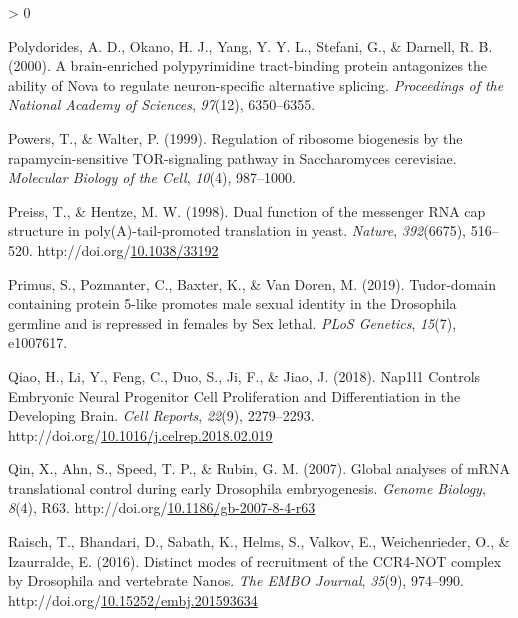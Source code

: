 \documentclass[12pt,oneside]{reedthesis}
\newlength{\cslhangindent}
\newenvironment{CSLReferences}[2] %
 {%
  \setlength{\parindent}{0pt}
  \ifodd #1 \everypar{\setlength{\hangindent}{\cslhangindent}}\ignorespaces\fi
  \ifnum #2 > 0
  \setlength{\parskip}{#2\baselineskip}
  \fi
 }%
 {}
\begin{document}
\begin{CSLReferences}{1}{0}
\leavevmode\hypertarget{ref-Polydorides2000}{}%
Polydorides, A. D., Okano, H. J., Yang, Y. Y. L., Stefani, G., \& Darnell, R. B. (2000). A brain-enriched polypyrimidine tract-binding protein antagonizes the ability of {Nova} to regulate neuron-specific alternative splicing. \emph{Proceedings of the National Academy of Sciences}, \emph{97}(12), 6350--6355.

\leavevmode\hypertarget{ref-powersRegulationRibosomeBiogenesis1999}{}%
Powers, T., \& Walter, P. (1999). Regulation of ribosome biogenesis by the rapamycin-sensitive {TOR}-signaling pathway in {Saccharomyces} cerevisiae. \emph{Molecular Biology of the Cell}, \emph{10}(4), 987--1000.

\leavevmode\hypertarget{ref-Preiss1998g}{}%
Preiss, T., \& Hentze, M. W. (1998). Dual function of the messenger {RNA} cap structure in poly({A})-tail-promoted translation in yeast. \emph{Nature}, \emph{392}(6675), 516--520. http://doi.org/\href{https://doi.org/10.1038/33192}{10.1038/33192}

\leavevmode\hypertarget{ref-Primus2019}{}%
Primus, S., Pozmanter, C., Baxter, K., \& Van Doren, M. (2019). Tudor-domain containing protein 5-like promotes male sexual identity in the {Drosophila} germline and is repressed in females by {Sex} lethal. \emph{PLoS Genetics}, \emph{15}(7), e1007617.

\leavevmode\hypertarget{ref-qiaoNap1l1ControlsEmbryonic2018}{}%
Qiao, H., Li, Y., Feng, C., Duo, S., Ji, F., \& Jiao, J. (2018). Nap1l1 {Controls Embryonic Neural Progenitor Cell Proliferation} and {Differentiation} in the {Developing Brain}. \emph{Cell Reports}, \emph{22}(9), 2279--2293. http://doi.org/\href{https://doi.org/10.1016/j.celrep.2018.02.019}{10.1016/j.celrep.2018.02.019}

\leavevmode\hypertarget{ref-qinGlobalAnalysesMRNA2007a}{}%
Qin, X., Ahn, S., Speed, T. P., \& Rubin, G. M. (2007). Global analyses of {mRNA} translational control during early {Drosophila} embryogenesis. \emph{Genome Biology}, \emph{8}(4), R63. http://doi.org/\href{https://doi.org/10.1186/gb-2007-8-4-r63}{10.1186/gb-2007-8-4-r63}

\leavevmode\hypertarget{ref-Raisch2016h}{}%
Raisch, T., Bhandari, D., Sabath, K., Helms, S., Valkov, E., Weichenrieder, O., \& Izaurralde, E. (2016). Distinct modes of recruitment of the {CCR4}-{NOT} complex by {Drosophila} and vertebrate {Nanos}. \emph{The EMBO Journal}, \emph{35}(9), 974--990. http://doi.org/\href{https://doi.org/10.15252/embj.201593634}{10.15252/embj.201593634}


\end{CSLReferences}
\end{document}
